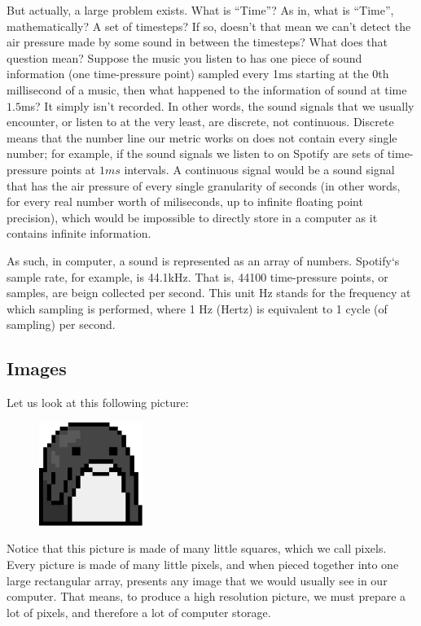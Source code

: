 But actually, a large problem exists. What is ``Time''?
As in, what is ``Time'', mathematically? A set of timesteps? If so, doesn't that mean we can't detect the air pressure made by some sound in between the timesteps?
What does that question mean?
Suppose the music you listen to has one piece of sound information (one time-pressure point) sampled every 1ms starting at the 0th millisecond of a music, then what happened to the information of sound at time $1.5$ms? It simply isn't recorded.
In other words, the sound signals that we usually encounter, or listen to at the very least, are discrete, not continuous.
Discrete means that the number line our metric works on does not contain every single number; for example, if the sound signals we listen to on Spotify are sets of time-pressure points at $1ms$ intervals.
A continuous signal would be a sound signal that has the air pressure of every single granularity of seconds (in other words, for every real number worth of miliseconds, up to infinite floating point precision), which would be impossible to directly store in a computer as it contains infinite information.

As such, in computer, a sound is represented as an array of numbers.
Spotify`s sample rate, for example, is 44.1kHz. That is, 44100 time-pressure points, or samples, are beign collected per second.
This unit Hz stands for the frequency at which sampling is performed, where 1 Hz (Hertz) is equivalent to 1 cycle (of sampling) per second.

\subsection{Images}
Let us look at this following picture:
\begin{center}
    \begin{figure}[h]
        \centering
        \includegraphics[width=0.3\textwidth]{figs/ln03/dunminghuang-grey.png}
    \end{figure}
\end{center}
Notice that this picture is made of many little squares, which we call pixels.
Every picture is made of many little pixels, and when pieced together into one large rectangular array, presents any image that we would usually see in our computer.
That means, to produce a high resolution picture, we must prepare a lot of pixels, and therefore a lot of computer storage.

